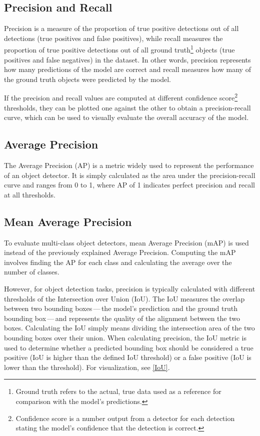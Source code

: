 \subsection*{Precision and Recall}

Precision is a measure of the proportion of true positive detections out of all
detections (true positives and false positives), while recall measures the
proportion of true positive detections out of all ground truth\footnote{Ground
truth refers to the actual, true data used as a reference for comparison with
the model's predictions.} objects (true positives and false negatives) in the
dataset. In other words, precision represents how many predictions of the model are
correct and recall measures how many of the ground truth objects were predicted
by the model.

If the precision and recall values are computed at different confidence
score\footnote{Confidence score is a number output from a detector for each
detection stating the model's confidence that the detection is correct.}
thresholds, they can be plotted one against the other to obtain a
precision-recall curve, which can be used to visually evaluate the overall
accuracy of the model.

\subsection*{Average Precision}

The Average Precision (AP) is a metric widely used to represent the performance
of an object detector. It is simply calculated as the area under the
precision-recall curve and ranges from 0 to 1, where AP of 1 indicates perfect
precision and recall at all thresholds.

\subsection*{Mean Average Precision}

To evaluate multi-class object detectors, mean Average Precision (mAP) is used
instead of the previously explained Average Precision. Computing the mAP
involves finding the AP for each class and calculating the average over the
number of classes.

However, for object detection tasks, precision is typically calculated with
different thresholds of the Intersection over Union (IoU). The IoU
measures the overlap between two bounding boxes\,---\,the model's
prediction and the ground truth bounding box\,---\,and represents the quality of the
alignment between the two boxes. Calculating the IoU simply means dividing the
intersection area of the two bounding boxes over their union. When calculating
precision, the IoU metric is used to determine whether a predicted bounding box
should be considered a true positive (IoU is higher than the defined IoU
threshold) or a false positive (IoU is lower than the threshold). For
visualization, see \autoref{IoU}.

